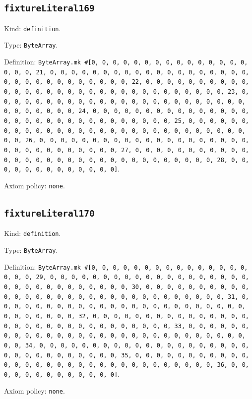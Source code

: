 \documentclass[11pt]{article}
\begin{document}
\subsection*{\texttt{fixtureLiteral169}}
\noindent Kind: \texttt{definition}.\par
\noindent Type: \texttt{ByteArray}.\par
\noindent Definition: \texttt{ByteArray.mk \#[0, 0, 0, 0, 0, 0, 0, 0, 0, 0, 0, 0, 0, 0, 0, 0, 0, 0, 21, 0, 0, 0, 0, 0, 0, 0, 0, 0, 0, 0, 0, 0, 0, 0, 0, 0, 0, 0, 0, 0, 0, 0, 0, 0, 0, 0, 0, 0, 0, 0, 22, 0, 0, 0, 0, 0, 0, 0, 0, 0, 0, 0, 0, 0, 0, 0, 0, 0, 0, 0, 0, 0, 0, 0, 0, 0, 0, 0, 0, 0, 0, 0, 23, 0, 0, 0, 0, 0, 0, 0, 0, 0, 0, 0, 0, 0, 0, 0, 0, 0, 0, 0, 0, 0, 0, 0, 0, 0, 0, 0, 0, 0, 0, 0, 24, 0, 0, 0, 0, 0, 0, 0, 0, 0, 0, 0, 0, 0, 0, 0, 0, 0, 0, 0, 0, 0, 0, 0, 0, 0, 0, 0, 0, 0, 0, 0, 25, 0, 0, 0, 0, 0, 0, 0, 0, 0, 0, 0, 0, 0, 0, 0, 0, 0, 0, 0, 0, 0, 0, 0, 0, 0, 0, 0, 0, 0, 0, 0, 26, 0, 0, 0, 0, 0, 0, 0, 0, 0, 0, 0, 0, 0, 0, 0, 0, 0, 0, 0, 0, 0, 0, 0, 0, 0, 0, 0, 0, 0, 0, 0, 27, 0, 0, 0, 0, 0, 0, 0, 0, 0, 0, 0, 0, 0, 0, 0, 0, 0, 0, 0, 0, 0, 0, 0, 0, 0, 0, 0, 0, 0, 0, 0, 28, 0, 0, 0, 0, 0, 0, 0, 0, 0, 0, 0, 0, 0]}.\par
\noindent Axiom policy: \texttt{none}.\par
\subsection*{\texttt{fixtureLiteral170}}
\noindent Kind: \texttt{definition}.\par
\noindent Type: \texttt{ByteArray}.\par
\noindent Definition: \texttt{ByteArray.mk \#[0, 0, 0, 0, 0, 0, 0, 0, 0, 0, 0, 0, 0, 0, 0, 0, 0, 0, 29, 0, 0, 0, 0, 0, 0, 0, 0, 0, 0, 0, 0, 0, 0, 0, 0, 0, 0, 0, 0, 0, 0, 0, 0, 0, 0, 0, 0, 0, 0, 0, 30, 0, 0, 0, 0, 0, 0, 0, 0, 0, 0, 0, 0, 0, 0, 0, 0, 0, 0, 0, 0, 0, 0, 0, 0, 0, 0, 0, 0, 0, 0, 0, 31, 0, 0, 0, 0, 0, 0, 0, 0, 0, 0, 0, 0, 0, 0, 0, 0, 0, 0, 0, 0, 0, 0, 0, 0, 0, 0, 0, 0, 0, 0, 0, 32, 0, 0, 0, 0, 0, 0, 0, 0, 0, 0, 0, 0, 0, 0, 0, 0, 0, 0, 0, 0, 0, 0, 0, 0, 0, 0, 0, 0, 0, 0, 0, 33, 0, 0, 0, 0, 0, 0, 0, 0, 0, 0, 0, 0, 0, 0, 0, 0, 0, 0, 0, 0, 0, 0, 0, 0, 0, 0, 0, 0, 0, 0, 0, 34, 0, 0, 0, 0, 0, 0, 0, 0, 0, 0, 0, 0, 0, 0, 0, 0, 0, 0, 0, 0, 0, 0, 0, 0, 0, 0, 0, 0, 0, 0, 0, 35, 0, 0, 0, 0, 0, 0, 0, 0, 0, 0, 0, 0, 0, 0, 0, 0, 0, 0, 0, 0, 0, 0, 0, 0, 0, 0, 0, 0, 0, 0, 0, 36, 0, 0, 0, 0, 0, 0, 0, 0, 0, 0, 0, 0, 0]}.\par
\noindent Axiom policy: \texttt{none}.\par
\end{document}
